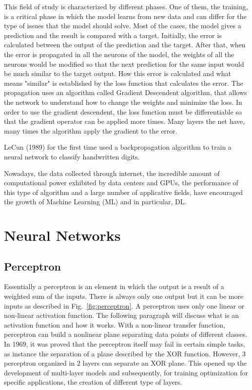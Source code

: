 \documentclass[12pt]{report}
\begin{document}
This field of study is characterized by different phases.
One of them, the training, is a critical phase in which the model learns from new data and can differ for the type of issues that the model should solve.
Most of the cases, the model gives a prediction and the result is compared with a target. Initially, the error is calculated between the
output of the prediction and the target. After that, when the error is propagated in all the neurons of the model,
the weights of all the neurons would be modified so that the next prediction for the same input would be much similar to the
target output. 
How this error is calculated and what means "similar" is established by the loss function that calculates the error.
The propagation uses an algorithm called Gradient Descendent algorithm, that allows the network 
to understand how to change the weights and minimize the loss.
In order to use the gradient descendent, the loss function must be differentiable so that
the gradient operator can be applied more times.
Many layers the net have, many times the algorithm apply the gradient to the error.

LeCun (1989) for the first time used a backpropagation algorithm to train a neural network to classify handwritten digits.

Nowadays, the data collected through internet, the incredible amount of computational power exhibited
by data centers and GPUs, the performance of this type of algorithm and a large number of applicative fields,
have encouraged the growth of Machine Learning (ML) and in particular, DL. 


\section{Neural Networks}

\subsection{Perceptron}

Essentially a perceptron is an element in which the output is a result of a weighted sum
of the inputs. There is always only one output but it can be more inputs as described in Fig.~\ref{fig:perceptron}. 
A perceptron uses only one linear or non-linear activation function. The following paragraph will discuss what is an activation function and how it works.
With a non-linear transfer function, perceptron can build a nonlinear plane separating data points of different classes.
In 1969, it was proved that the perceptron itself may fail in certain simple tasks, as instance
the separation of a plane described by the XOR function. 
However, 3 perceptron organized in 2 layers can separate an XOR plane.
This opened up the development of multi-layer models and subsequently, for training optimization for specific
applications, the creation of different type of layers.
\end{document}
